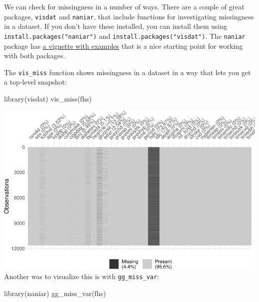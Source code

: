 \documentclass[
]{book}
\newenvironment{Shaded}{\begin{snugshade}}{\end{snugshade}}
\newcommand{\FunctionTok}[1]{\textcolor[rgb]{0.00,0.00,0.00}{#1}}
\newcommand{\NormalTok}[1]{#1}
\begin{document}
We can check for missingness in a number of ways. There are a couple of great
packages, \texttt{visdat} and \texttt{naniar}, that include functions for investigating
missingness in a dataset. If you don't have these installed, you can install
them using \texttt{install.packages("naniar")} and \texttt{install.packages("visdat")}. The
\texttt{naniar} package has \href{https://cran.r-project.org/web/packages/naniar/vignettes/getting-started-w-naniar.html}{a vignette with
examples}
that is a nice starting point for working with both packages.

The \texttt{vis\_miss} function shows missingness in a dataset in a way that lets you
get a top-level snapshot:

\begin{Shaded}
\begin{Highlighting}[]
\FunctionTok{library}\NormalTok{(visdat)}
\FunctionTok{vis\_miss}\NormalTok{(fhs)}
\end{Highlighting}
\end{Shaded}

\includegraphics{adv_epi_analysis_files/figure-latex/unnamed-chunk-170-1.pdf}
Another was to visualize this is with \texttt{gg\_miss\_var}:

\begin{Shaded}
\begin{Highlighting}[]
\FunctionTok{library}\NormalTok{(naniar)}
\FunctionTok{gg\_miss\_var}\NormalTok{(fhs)}
\end{Highlighting}
\end{Shaded}
\end{document}
